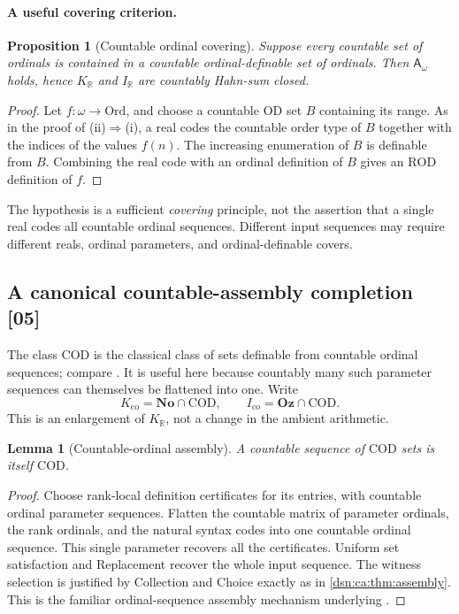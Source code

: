 \documentclass[11pt,a4paper]{article}
\numberwithin{equation}{section}
\newtheorem{lemma}[lemma]{Lemma}
\newtheorem{proposition}[proposition]{Proposition}
\theoremstyle{definition}
\theoremstyle{remark}
\newcommand{\No}{\mathbf{No}}
\newcommand{\Oz}{\mathbf{Oz}}
\newcommand{\Ord}{\mathrm{Ord}}
\newcommand{\OD}{\mathrm{OD}}
\newcommand{\R}{\mathbb R}
\newcommand{\src}[1]{\textup{\textsf{\small[#1]}}}
\newcommand{\ROD}{\mathrm{ROD}}
\newcommand{\COD}{\mathrm{COD}}
\newcommand{\KR}{K_{\R}}
\newcommand{\IR}{I_{\R}}
\newcommand{\Kco}{K_{\mathrm{co}}}
\newcommand{\Ico}{I_{\mathrm{co}}}
\newcommand{\Asm}{\mathsf A_{\omega}}
\begin{document}
\paragraph{A useful covering criterion.}
\begin{proposition}[Countable ordinal covering]\label{dsn:ca:prop:cover}
Suppose every countable set of ordinals is contained in a countable
ordinal-definable set of ordinals. Then $\Asm$ holds, hence $\KR$ and
$\IR$ are countably Hahn-sum closed.
\end{proposition}
\begin{proof}
Let $f:\omega\to\Ord$, and choose a countable $\OD$ set $B$ containing
its range. As in the proof of (ii)$\Rightarrow$(i), a real codes the
countable order type of $B$ together with the indices of the values
$f(n)$. The increasing enumeration of $B$ is definable from $B$.
Combining the real code with an ordinal definition of $B$ gives an
$\ROD$ definition of $f$.
\end{proof}

The hypothesis is a sufficient \emph{covering} principle, not the
assertion that a single real codes all countable ordinal sequences.
Different input sequences may require different reals, ordinal
parameters, and ordinal-definable covers.

\subsection{A canonical countable-assembly completion \src{05}}
\label{dsn:ca:sec:completion}


The class $\COD$ is the classical class of sets definable from countable
ordinal sequences; compare \cite[III.2.2]{Solovay}. It is useful here
because countably many such parameter sequences can themselves be
flattened into one. Write
\[
 \Kco=\No\cap\COD,\qquad \Ico=\Oz\cap\COD.
\]
This is an enlargement of $\KR$, not a change in the ambient arithmetic.

\begin{lemma}[Countable-ordinal assembly]\label{dsn:ca:lem:codclosure}
A countable sequence of $\COD$ sets is itself $\COD$.
\end{lemma}
\begin{proof}
Choose rank-local definition certificates for its entries, with
countable ordinal parameter sequences. Flatten the countable matrix
of parameter ordinals, the rank ordinals, and the natural syntax codes
into one countable ordinal sequence. This single parameter recovers
all the certificates. Uniform set satisfaction and Replacement recover
the whole input sequence. The witness selection is justified by
Collection and Choice exactly as in \cref{dsn:ca:thm:assembly}. This is the
familiar ordinal-sequence assembly mechanism underlying
\cite[III.2.6]{Solovay}.
\end{proof}
\end{document}
